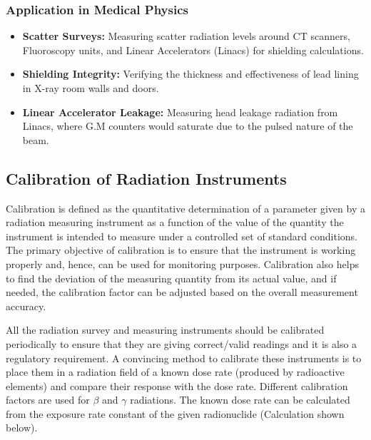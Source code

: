 \subsubsection{Application in Medical Physics}
\begin{itemize}
    \item \textbf{Scatter Surveys:} Measuring scatter radiation levels around CT scanners, Fluoroscopy units, and Linear Accelerators (Linacs) for shielding calculations.
    \item \textbf{Shielding Integrity:} Verifying the thickness and effectiveness of lead lining in X-ray room walls and doors.
    \item \textbf{Linear Accelerator Leakage:} Measuring head leakage radiation from Linacs, where G.M counters would saturate due to the pulsed nature of the beam.
\end{itemize}

\subsection{Calibration of Radiation Instruments}
Calibration is defined as the quantitative determination of a parameter given by a radiation
measuring instrument as a function of the value of the quantity the instrument is intended to measure
under a controlled set of standard conditions. The primary objective of calibration is to ensure that the
instrument is working properly and, hence, can be used for monitoring purposes. Calibration also helps
to find the deviation of the measuring quantity from its actual value, and if needed, the calibration
factor can be adjusted based on the overall measurement accuracy.

All the radiation survey and measuring instruments should be calibrated periodically to ensure
that they are giving correct/valid readings and it is also a regulatory requirement. A convincing method
to calibrate these instruments is to place them in a radiation field of a known dose rate (produced by
radioactive elements) and compare their response with the dose rate. Different calibration factors are
used for $\beta$ and $\gamma$ radiations. The known dose rate can be calculated from the exposure rate constant of
the given radionuclide (Calculation shown below).
